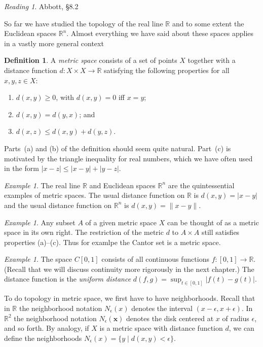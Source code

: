 \documentclass[11pt,oneside]{amsbook}
\newcommand{\R}{\mathbb R}
\theoremstyle{definition}
\theoremstyle{plain}
\theoremstyle{definition}
\newtheorem{definition}[theorem]{Definition}
\theoremstyle{remark}
\newtheorem{example}[theorem]{Example}
\newtheorem*{reading}{Reading}
\numberwithin{equation}{section}
\numberwithin{figure}{section}
\begin{document}
\begin{reading}
  Abbott, \S 8.2
\end{reading}

So far we have studied the topology of the real line $\R$ and to some extent the Euclidean spaces $\R^n$. Almost everything we have said about these spaces applies in a vastly more general context

\begin{definition}
  A \emph{metric space} consists of a set of points $X$ together with a distance function $d\colon X\times X\to\R$ satisfying the following properties for all $x,y,z\in X$:
  \begin{enumerate}
  \item $d(x,y)\geq0$, with $d(x,y)=0$ iff $x=y$;
  \item $d(x,y)=d(y,x)$; and
  \item $d(x,z)\leq d(x,y)+d(y,z)$.
  \end{enumerate}
\end{definition}

Parts~(a) and (b) of the definition should seem quite natural. Part~(c) is motivated by the triangle inequality for real numbers, which we have often used in the form $|x-z|\leq|x-y|+|y-z|$.

\begin{example}
  The real line $\R$ and Euclidean spaces $\R^n$ are the quintessential examples of metric spaces. The usual distance function on $\R$ is $d(x,y)=|x-y|$ and the usual distance function on $\R^n$ is $d(x,y)=\|x-y\|$.
\end{example}

\begin{example}
  Any subset $A$ of a given metric space $X$ can be thought of as a metric space in its own right. The restriction of the metric $d$ to $A\times A$ still satisfies properties (a)--(c). Thus for examlpe the Cantor set is a metric space.
\end{example}

\begin{example}
  The space $C[0,1]$ consists of all continuous functions $f\colon[0,1]\to\R$. (Recall that we will discuss continuity more rigorously in the next chapter.) The distance function is the \emph{uniform distance} $d(f,g)=\sup_{t\in[0,1]}|f(t)-g(t)|$.
\end{example}

To do topology in metric space, we first have to have neighborhoods. Recall that in $\R$ the neighborhood notation $N_\epsilon(x)$ denotes the interval $(x-\epsilon,x+\epsilon)$. In $\R^2$ the neighborhood notation $N_\epsilon(\mathbf{x})$ denotes the disk centered at $x$ of radius $\epsilon$, and so forth. By analogy, if $X$ is a metric space with distance function $d$, we can define the neighborhoods $N_\epsilon(x)=\{y\mid d(x,y)<\epsilon\}$.
\end{document}
